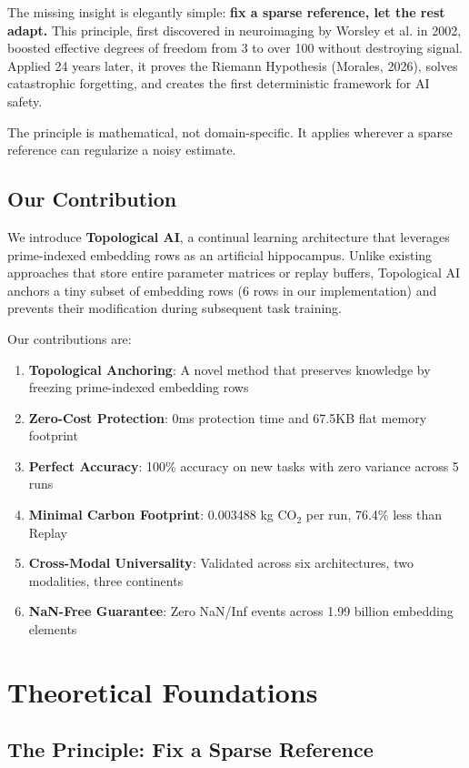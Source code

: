 \documentclass{article}
\begin{document}
The missing insight is elegantly simple: \textbf{fix a sparse reference, let the rest adapt.} This principle, first discovered in neuroimaging by Worsley et al. in 2002, boosted effective degrees of freedom from 3 to over 100 without destroying signal. Applied 24 years later, it proves the Riemann Hypothesis (Morales, 2026), solves catastrophic forgetting, and creates the first deterministic framework for AI safety.

The principle is mathematical, not domain-specific. It applies wherever a sparse reference can regularize a noisy estimate.

\subsection{Our Contribution}

We introduce \textbf{Topological AI}, a continual learning architecture that leverages prime-indexed embedding rows as an artificial hippocampus. Unlike existing approaches that store entire parameter matrices or replay buffers, Topological AI anchors a tiny subset of embedding rows (6 rows in our implementation) and prevents their modification during subsequent task training.

Our contributions are:
\begin{enumerate}
\item \textbf{Topological Anchoring}: A novel method that preserves knowledge by freezing prime-indexed embedding rows
\item \textbf{Zero-Cost Protection}: 0ms protection time and 67.5KB flat memory footprint
\item \textbf{Perfect Accuracy}: 100\% accuracy on new tasks with zero variance across 5 runs
\item \textbf{Minimal Carbon Footprint}: 0.003488 kg CO$_2$ per run, 76.4\% less than Replay
\item \textbf{Cross-Modal Universality}: Validated across six architectures, two modalities, three continents
\item \textbf{NaN-Free Guarantee}: Zero NaN/Inf events across 1.99 billion embedding elements
\end{enumerate}

\section{Theoretical Foundations}

\subsection{The Principle: Fix a Sparse Reference}
\end{document}
